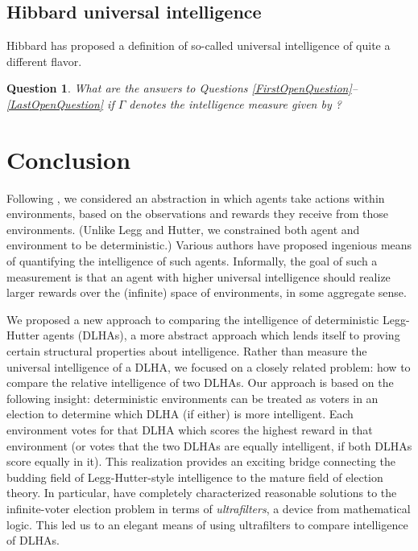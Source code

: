 \documentclass[twoside,11pt]{article}
\newtheorem{question}[theorem]{Question}
\begin{document}
\subsection{Hibbard universal intelligence}

Hibbard has proposed \citep{hibbard} a definition of so-called universal intelligence
of quite a different flavor.

\begin{question}
\label{ReallyLastOpenquestion}
    What are the answers to Questions \ref{FirstOpenQuestion}--\ref{LastOpenQuestion}
    if $\varGamma$ denotes the intelligence measure given by
    \citet{hibbard}?
\end{question}

\section{Conclusion}

Following \citet{hutter2007}, we considered an abstraction in
which agents take actions within environments, based on the observations and
rewards they receive from those environments.
(Unlike Legg and Hutter, we constrained both agent and environment to be
deterministic.)
Various authors
\citep{hutter2007, hernandez, hibbard} have proposed
ingenious means of quantifying the intelligence
of such agents.
Informally, the goal of such a measurement is that
an agent with higher universal intelligence should realize larger rewards
over the (infinite) space of environments, in some aggregate
sense.

We proposed a new approach to comparing the intelligence of
deterministic Legg-Hutter agents (DLHAs), a more
abstract approach which lends itself to proving certain structural properties
about intelligence. Rather than measure the universal intelligence of a
DLHA, we focused on a closely related problem: how to compare the relative
intelligence of two DLHAs. Our approach is based on the following
insight: deterministic environments can be treated as voters in an election to determine
which DLHA (if either) is more intelligent. Each environment votes for that
DLHA which scores the highest reward in that environment (or votes that the
two DLHAs are equally intelligent, if both DLHAs score equally in it).
This realization provides an exciting bridge connecting the budding field of
Legg-Hutter-style intelligence to
the mature field of election theory.
In particular,
\citet{kirman} have completely characterized
reasonable solutions to the infinite-voter election problem in terms of \emph{ultrafilters},
a device from mathematical logic. This led us to an elegant means
of using ultrafilters to compare intelligence of DLHAs.
\end{document}

